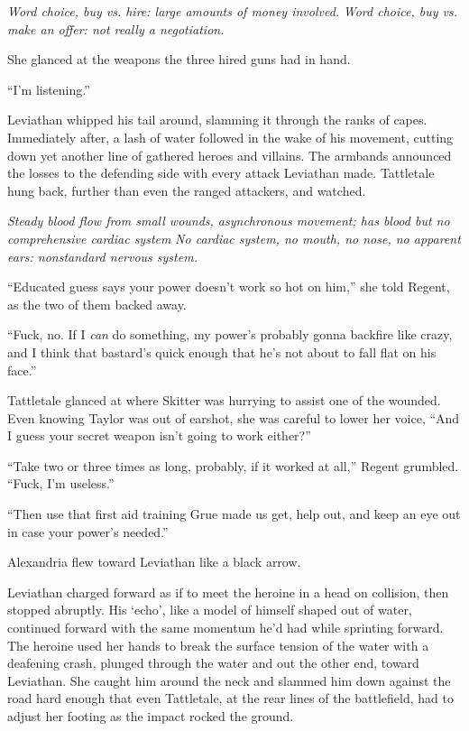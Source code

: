 \emph{Word choice, buy vs. hire: large amounts of money involved.}\emph{ Word choice, buy vs. make an offer: not really a negotiation.}



She glanced at the weapons the three hired guns had in hand.



``I'm listening.''



\sectionbreak



Leviathan whipped his tail around, slamming it through the ranks of capes.  Immediately after, a lash of water followed in the wake of his movement, cutting down yet another line of gathered heroes and villains.  The armbands announced the losses to the defending side with every attack Leviathan made.  Tattletale hung back, further than even the ranged attackers, and watched.



\emph{Steady blood flow from small wounds, asynchronous movement; has blood but no comprehensive cardiac system}\emph{ No cardiac system, no mouth, no nose, no apparent ears: nonstandard nervous system.}



``Educated guess says your power doesn't work so hot on him,'' she told Regent, as the two of them backed away.



``Fuck, no.  If I \emph{can} do something, my power's probably gonna backfire like crazy, and I think that bastard's quick enough that he's not about to fall flat on his face.''



Tattletale glanced at where Skitter was hurrying to assist one of the wounded.  Even knowing Taylor was out of earshot, she was careful to lower her voice, ``And I guess your secret weapon isn't going to work either?''



``Take two or three times as long, probably, if it worked at all,'' Regent grumbled.  ``Fuck, I'm useless.''



``Then use that first aid training Grue made us get, help out, and keep an eye out in case your power's needed.''



Alexandria flew toward Leviathan like a black arrow.



Leviathan charged forward as if to meet the heroine in a head on collision, then stopped abruptly.  His `echo', like a model of himself shaped out of water, continued forward with the same momentum he'd had while sprinting forward.  The heroine used her hands to break the surface tension of the water with a deafening crash, plunged through the water and out the other end, toward Leviathan.  She caught him around the neck and slammed him down against the road hard enough that even Tattletale, at the rear lines of the battlefield, had to adjust her footing as the impact rocked the ground.




